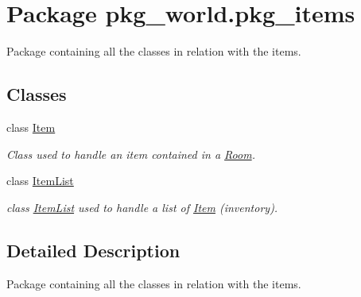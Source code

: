 \hypertarget{namespacepkg__world_1_1pkg__items}{\section{Package pkg\-\_\-world.\-pkg\-\_\-items}
\label{namespacepkg__world_1_1pkg__items}
}


Package containing all the classes in relation with the items.  


\subsection*{Classes}
\begin{DoxyCompactItemize}
\item 
class \hyperlink{classpkg__world_1_1pkg__items_1_1Item}{Item}
\begin{DoxyCompactList}\small\item\em Class used to handle an item contained in a \hyperlink{classpkg__world_1_1Room}{Room}. \end{DoxyCompactList}\item 
class \hyperlink{classpkg__world_1_1pkg__items_1_1ItemList}{Item\-List}
\begin{DoxyCompactList}\small\item\em class \hyperlink{classpkg__world_1_1pkg__items_1_1ItemList}{Item\-List} used to handle a list of \hyperlink{classpkg__world_1_1pkg__items_1_1Item}{Item} (inventory). \end{DoxyCompactList}\end{DoxyCompactItemize}


\subsection{Detailed Description}
Package containing all the classes in relation with the items. 